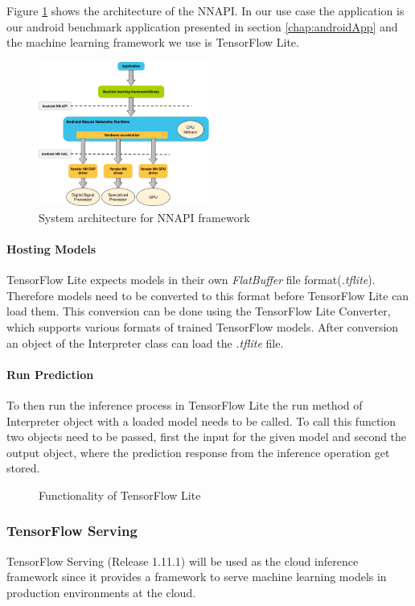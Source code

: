 Figure \ref{fig:NNAPIarchitecture} shows the architecture of the NNAPI. In our use case the application is our android benchmark application presented in section \ref{chap:androidApp} and the machine learning framework we use is TensorFlow Lite.
\begin{figure}[!htb]
\centering
\includegraphics[width=0.5\textwidth]{./Bilder/nnapi_architecture.png}
\caption{System architecture for NNAPI framework \cite{NNAPI}}
\label{fig:NNAPIarchitecture}
\end{figure}


\paragraph{Hosting Models}
TensorFlow Lite expects models in their own \emph{FlatBuffer} file  format(\emph{.tflite}). Therefore models need to be converted to this format before TensorFlow Lite can load them. This conversion can be done using the TensorFlow Lite Converter, which supports various formats of trained TensorFlow models.
After conversion an object of the Interpreter class can load the \emph{.tflite} file.
\paragraph{Run Prediction}

To then run the inference process in TensorFlow Lite the run method of Interpreter object with a loaded model needs to be called. To call this function two objects need to be passed, first the input for the given model and second the output object, where the prediction response from the inference operation get stored. 
\begin{figure}[H]
\centering

\caption{Functionality of TensorFlow Lite}
\label{fig:edge}
\end{figure}

\subsubsection{TensorFlow Serving}
\label{chap:TFServing}
TensorFlow Serving (Release 1.11.1) will be used as the cloud inference framework since it provides a framework to serve machine learning models in production environments at the cloud. 



